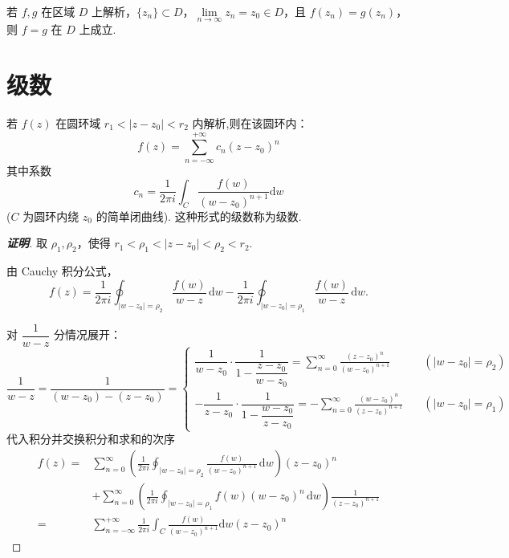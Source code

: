 \documentclass[openany,oneside]{ctexbook}
\begin{document}
\begin{corollary}
若 \( f,g \) 在区域 \( D \) 上解析，\( \{z_n\}\subset D \)，\( \lim\limits_{n\to\infty} z_n = z_0\in D \)，且 \( f(z_n)=g(z_n) \)，则 \( f=g \) 在 \( D \) 上成立.
\end{corollary}
\section{级数}
\begin{theorem}
  若 $f(z)$ 在圆环域 $r_1 < |z - z_0| < r_2$ 内解析,则在该圆环内：
\[
f(z) = \sum_{n=-\infty}^{+\infty} c_n(z - z_0)^n
\]
其中系数 \[c_n = \frac{1}{2\pi i} \int_C \frac{f(w)}{(w - z_0)^{n+1}}\mathrm{d}w\]
($C$ 为圆环内绕 $z_0$ 的简单闭曲线).
这种形式的级数称为级数.
\end{theorem}
\begin{proof}[\textbf{证明}]
  取 $\rho_1, \rho_2$，使得 $r_1<\rho_1<|z-z_0|<\rho_2<r_2$.

由 Cauchy 积分公式，
\[
f(z) = \frac{1}{2\pi i} \oint_{|w-z_0|=\rho_2} \frac{f(w)}{w-z} \, \mathrm{d}w - \frac{1}{2\pi i} \oint_{|w-z_0|=\rho_1} \frac{f(w)}{w-z} \, \mathrm{d}w.
\]

对 $\dfrac{1}{w-z}$ 分情况展开：
\[
\frac{1}{w-z} = \frac{1}{(w-z_0)-(z-z_0)}
=
\begin{cases}
\dfrac{1}{w-z_0} \cdot \dfrac{1}{1-\dfrac{z-z_0}{w-z_0}}
= \displaystyle\sum_{n=0}^{\infty} \frac{(z-z_0)^n}{(w-z_0)^{n+1}}
& \quad (|w-z_0|=\rho_2) \\[12pt]
-\dfrac{1}{z-z_0} \cdot \dfrac{1}{1-\dfrac{w-z_0}{z-z_0}}
= -\displaystyle\sum_{n=0}^{\infty} \frac{(w-z_0)^n}{(z-z_0)^{n+1}}
& \quad (|w-z_0|=\rho_1)
\end{cases}
\]
代入积分并交换积分和求和的次序
\begin{align*}
    f(z) =& \sum_{n=0}^{\infty} \left( \frac{1}{2\pi i} \oint_{|w-z_0|=\rho_2} \frac{f(w)}{(w-z_0)^{n+1}} \, \mathrm{d}w \right) (z-z_0)^n \\
    & + \sum_{n=0}^{\infty} \left( \frac{1}{2\pi i} \oint_{|w-z_0|=\rho_1} f(w)(w-z_0)^n \, \mathrm{d}w \right) \frac{1}{(z-z_0)^{n+1}}\\
    =& \sum_{n=-\infty}^{+\infty} \frac{1}{2\pi i} \int_C \frac{f(w)}{(w-z_0)^{n+1}}\mathrm{d}w(z-z_0)^n
\end{align*}
\end{proof}
\end{document}
